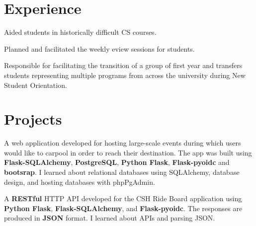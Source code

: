\documentclass[]{deedy-resume-openfont}
\begin{document}
\hfill
\begin{minipage}[t]{0.66\textwidth}


\section{Experience}
\vspace{\topsep} %
\begin{tightemize}\item Aided students in historically difficult CS courses.
  \item Planned and facilitated the weekly eview sessions for students.
\end{tightemize}
\sectionsep

\begin{tightemize}
\item Responsible for facilitating the transition of a group of first year and
transfers students representing multiple programs from across the
university during New Student Orientation.
\end{tightemize}
\sectionsep


\section{Projects}
A web application developed for hosting large-scale events during which users would like to carpool in order to reach their destination.
The app was built using \textbf{Flask-SQLAlchemy}, \textbf{PostgreSQL}, \textbf{Python Flask}, \textbf{Flask-pyoidc} and \textbf{bootsrap}.
I learned about relational databases using SQLAlchemy, database design, and hosting databases with phpPgAdmin.
\sectionsep

A \textbf{RESTful} HTTP API developed for the CSH Ride Board application using \textbf{Python Flask}, \textbf{Flask-SQLAlchemy}, and \textbf{Flask-pyoidc}. The responses are produced in \textbf{JSON} format. I learned about APIs and parsing JSON.
\sectionsep


\end{minipage}
\end{document}
